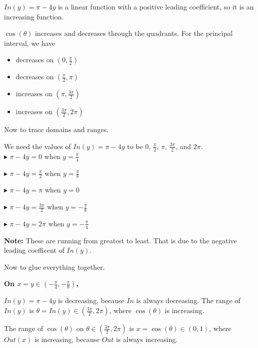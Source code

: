 \documentclass{ximera}
\begin{document}
$In(y) = \pi - 4y$ is a linear function with a positive leading coefficient, so it is an increasing function.


$\cos(\theta)$ increases and decreases through the quadrants. For the principal interval, we have


\begin{itemize}
  \item decreases on $\left( 0, \frac{\pi}{2} \right)$
  \item decreases on $\left( \frac{\pi}{2}, \pi \right)$
  \item increases on $\left( \pi, \frac{3\pi}{2} \right)$
  \item increases on $\left( \frac{3\pi}{2}, 2\pi \right)$
\end{itemize}


Now to trace domains and ranges.


We need the values of $In(y) = \pi - 4y$ to be $0$, $\frac{\pi}{2}$, $\pi$, $\frac{3\pi}{2}$, and $2\pi$. \\



$\blacktriangleright$ $\pi - 4y = 0$ when $y = \frac{\pi}{4}$ 

$\blacktriangleright$ $\pi - 4y = \frac{\pi}{2}$ when $y = \frac{\pi}{8}$ 

$\blacktriangleright$ $\pi - 4y = \pi$ when $y = 0$ 

$\blacktriangleright$ $\pi - 4y = \frac{3\pi}{2}$ when $y = -\frac{\pi}{8}$ 

$\blacktriangleright$ $\pi - 4y = 2\pi$ when $y = -\frac{\pi}{4}$ 


\textbf{Note:}  These are running from greatest to least.  That is due to the negative leading coefficent of $In(y)$. 






Now to glue everything together. 



\textbf{\textcolor{purple!80!black}{On $x = y \in \left( -\frac{\pi}{4}, -\frac{\pi}{8} \right)$, }}



$In(y) = \pi - 4y$ is decreasing, because $In$ is always decreasing.  The range of $In(y)$ is $\theta = In(y) \in \left(\frac{3\pi}{2}, 2\pi \right)$, where $\cos(\theta)$ is increasing. 



The range of $\cos(\theta)$ on $\theta \in \left(\frac{3\pi}{2}, 2\pi \right)$ is $x = \cos(\theta) \in (0, 1)$, where $Out(x)$ is increasing, because $Out$ is always increasing. 
\end{document}
